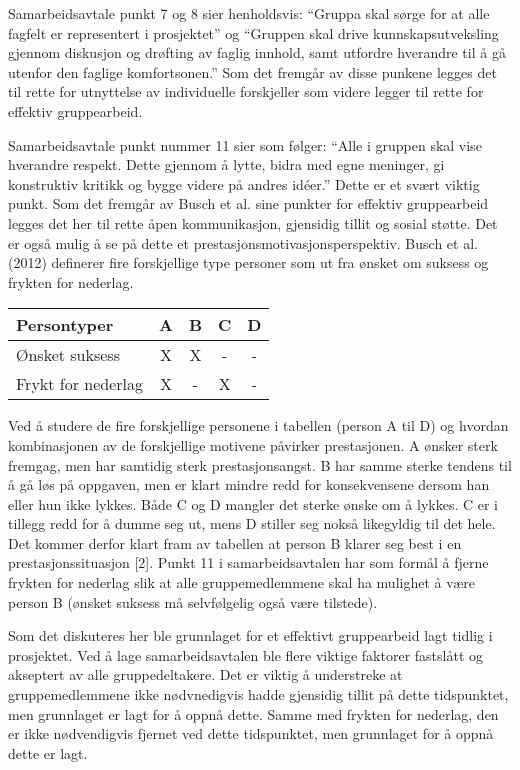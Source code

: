 Samarbeidsavtale punkt 7 og 8 sier henholdsvis:
“Gruppa skal sørge for at alle fagfelt er representert i prosjektet” og “Gruppen skal drive kunnskapsutveksling gjennom diskusjon og drøfting av faglig innhold, samt utfordre hverandre til å gå utenfor den faglige komfortsonen.”
Som det fremgår av disse punkene legges det til rette for utnyttelse av individuelle forskjeller som videre legger til rette for effektiv gruppearbeid.

Samarbeidsavtale punkt nummer 11 sier som følger:
“Alle i gruppen skal vise hverandre respekt. Dette gjennom å lytte, bidra med egne meninger, gi konstruktiv kritikk og bygge videre på andres idéer.”
Dette er et svært viktig punkt.
Som det fremgår av Busch et al. sine punkter for effektiv gruppearbeid legges det her til rette åpen kommunikasjon, gjensidig tillit og sosial støtte.
Det er også mulig å se på dette et prestasjonsmotivasjonsperspektiv.
Busch et al. (2012) definerer fire forskjellige type personer som ut fra ønsket om suksess og frykten for nederlag.

\begin{center}
	\begin{tabular}{|l|c|c|c|c|}
		\hline
		Persontyper & A & B & C & D \\ \hline
		Ønsket suksess & X & X & - & - \\ \hline
		Frykt for nederlag & X & - & X & - \\ \hline
	\end{tabular}
\end{center}

Ved å studere de fire forskjellige personene i tabellen (person A til D) og hvordan kombinasjonen av de forskjellige motivene påvirker prestasjonen.
A ønsker sterk fremgag, men har samtidig sterk prestasjonsangst.
B har samme sterke tendens til å gå løs på oppgaven, men er klart mindre redd for konsekvensene dersom han eller hun ikke lykkes.
Både C og D mangler det sterke ønske om å lykkes.
C er i tillegg redd for å dumme seg ut, mens D stiller seg nokså likegyldig til det hele.
Det kommer derfor klart fram av tabellen at person B klarer seg best i en prestasjonssituasjon [2].
Punkt 11 i samarbeidsavtalen har som formål å fjerne frykten for nederlag slik at alle gruppemedlemmene skal ha mulighet å være person B (ønsket suksess må selvfølgelig også være tilstede).

Som det diskuteres her ble grunnlaget for et effektivt gruppearbeid lagt tidlig i prosjektet.
Ved å lage samarbeidsavtalen ble flere viktige faktorer fastslått og akseptert av alle gruppedeltakere.
Det er viktig å understreke at gruppemedlemmene ikke nødvnedigvis hadde gjensidig tillit på dette tidspunktet, men grunnlaget er lagt for å oppnå dette.
Samme med frykten for nederlag, den er ikke nødvendigvis fjernet ved dette tidspunktet, men grunnlaget for å oppnå dette er lagt.
